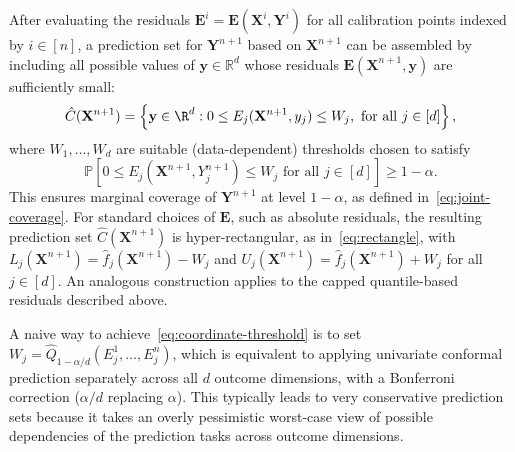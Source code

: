 After evaluating the residuals $\mathbf{E}^i = \mathbf E(\mathbf X^i, \mathbf Y^i)$ for all calibration points indexed by $i \in [n]$, a prediction set for $\mathbf{Y}^{n+1}$ based on $\mathbf{X}^{n+1}$ can be assembled by including all possible values of $\mathbf y \in \mathbb{R}^d$ whose residuals $\mathbf E(\mathbf{X}^{n+1}, \mathbf y)$ are sufficiently small:
\begin{equation}
    \hat{C}(\mathbf{X}^{n+1}) = \left\{\mathbf y \in \R^d: 0\leq E_j(\mathbf{X}^{n+1},y_j) \leq W_j, \text{ for all } j \in [d] \right\},
    \label{eq:joint-prediction}
\end{equation}
{\color{blue}where $W_1,\ldots,W_d$ are suitable (data-dependent) thresholds chosen to satisfy
\begin{equation}
    \mathbb{P} \left[0\leq E_j(\mathbf{X}^{n+1}, {Y}^{n+1}_j) \leq W_j \text{ for all } j \in [d] \right] \geq 1-\alpha.
    \label{eq:coordinate-threshold}
\end{equation}
This ensures marginal coverage of $\mathbf{Y}^{n+1}$ at level $1-\alpha$, as defined in~\eqref{eq:joint-coverage}. For standard choices of $\mathbf E$, such as absolute residuals, the resulting prediction set $\hat{C}(\mathbf{X}^{n+1})$ is hyper-rectangular, as in~\eqref{eq:rectangle}, with $L_j(\mathbf{X}^{n+1}) = \hat{f}_j(\mathbf{X}^{n+1}) - W_j$ and $U_j(\mathbf{X}^{n+1}) = \hat{f}_j(\mathbf{X}^{n+1}) + W_j$ for all $j \in [d]$. An analogous construction applies to the capped quantile-based residuals described above.}

A naive way to achieve~\eqref{eq:coordinate-threshold} is to set $W_j = \hat{Q}_{1-\alpha/d}({E}^1_j, \ldots ,E^n_j)$, which is equivalent to applying univariate conformal prediction separately across all $d$ outcome dimensions, with a Bonferroni correction ($\alpha/d$ replacing $\alpha$).
This typically leads to very conservative prediction sets because it takes an overly pessimistic worst-case view of possible dependencies of the prediction tasks across outcome dimensions.

